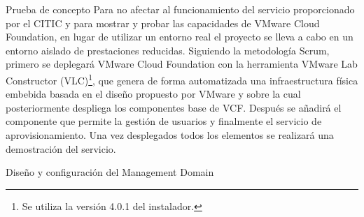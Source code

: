 \begin{section}{Prueba de concepto}
Para no afectar al funcionamiento del servicio proporcionado por el CITIC y para mostrar y probar las capacidades de VMware Cloud Foundation, en lugar de utilizar un entorno real el proyecto se lleva a cabo en un entorno aislado de prestaciones reducidas. Siguiendo la metodología Scrum, primero se deplegará VMware Cloud Foundation con la herramienta VMware Lab Constructor (VLC)\footnote{Se utiliza la versión 4.0.1 del instalador.}, que genera de forma automatizada una infraestructura física embebida basada en el diseño propuesto por VMware y sobre la cual posteriormente despliega los componentes base de VCF. Después se añadirá el componente que permite la gestión de usuarios y finalmente el servicio de aprovisionamiento. Una vez desplegados todos los elementos se realizará una demostración del servicio.



\begin{subsection}{Diseño y configuración del Management Domain}


\end{subsection}

\end{section}